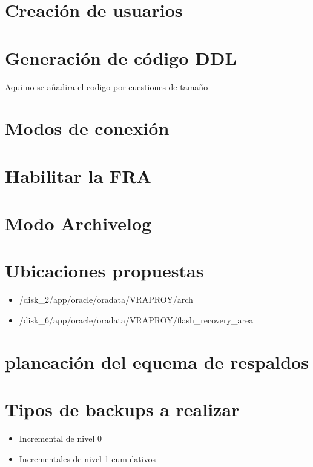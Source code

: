 \documentclass[journal]{IEEEtran}
\begin{document}
\section{Creación de usuarios}

\section{Generación de código DDL}
Aqui no se añadira el codigo por cuestiones de tamaño
\section{Modos de conexión}

\section{Habilitar la FRA}

\section{Modo Archivelog}

\section{Ubicaciones propuestas}
\begin{itemize}
  \item /disk\_2/app/oracle/oradata/VRAPROY/arch
  \item /disk\_6/app/oracle/oradata/VRAPROY/flash\_recovery\_area
\end{itemize}
\section{planeación del equema de respaldos}
\section{Tipos de backups a realizar}
\begin{itemize}
  \item Incremental de nivel 0
  \item Incrementales de nivel 1 cumulativos
\end{itemize}
\end{document}
